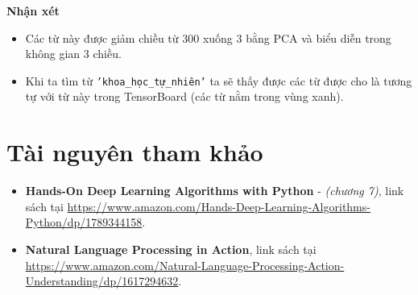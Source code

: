 \documentclass[12pt]{article}
\begin{document}
\begin{tcolorbox}[grow to left by=-0.6cm]
  \textbf{Nhận xét}
  \begin{itemize}
    \item Các từ này được giảm chiều từ 300 xuống 3 bằng PCA và biểu diễn trong không gian 3 chiều.
    \item Khi ta tìm từ \texttt{'khoa\_học\_tự\_nhiên'} ta sẽ thấy được các từ được cho là tương tự với từ này trong TensorBoard (các từ nằm trong vùng xanh).
  \end{itemize}
\end{tcolorbox}

\section{Tài nguyên tham khảo}
\begin{itemize}
  \item \textbf{\color{teal} Hands-On Deep Learning Algorithms with Python} - \textit{(chương 7)}, link sách tại \href{https://www.amazon.com/Hands-Deep-Learning-Algorithms-Python/dp/1789344158}{\color{blue} https://www.amazon.com/Hands-Deep-Learning-Algorithms-Python/dp/1789344158}.
  \item \textbf{\color{teal} Natural Language Processing in Action}, link sách tại \href{https://www.amazon.com/Natural-Language-Processing-Action-Understanding/dp/1617294632}{\color{blue} https://www.amazon.com/Natural-Language-Processing-Action-Understanding/dp/1617294632}. 
\end{itemize}
\end{document}
